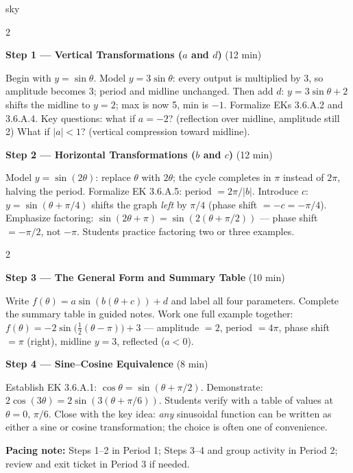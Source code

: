 \documentclass[10pt]{article}
\begin{document}
\begin{skillbox}{sky}
\begin{multicols}{2}

\textbf{Step 1 --- Vertical Transformations ($a$ and $d$)} (12 min)

Begin with $y=\sin\theta$. Model $y=3\sin\theta$: every output is
multiplied by 3, so amplitude becomes 3; period and midline unchanged.
Then add $d$: $y=3\sin\theta+2$ shifts the midline to $y=2$; max is
now 5, min is $-1$. Formalize EKs 3.6.A.2 and 3.6.A.4.
Key questions: what if $a=-2$? (reflection over midline, amplitude still 2)
What if $|a|<1$? (vertical compression toward midline).

\columnbreak

\textbf{Step 2 --- Horizontal Transformations ($b$ and $c$)} (12 min)

Model $y=\sin(2\theta)$: replace $\theta$ with $2\theta$; the cycle
completes in $\pi$ instead of $2\pi$, halving the period.
Formalize EK 3.6.A.5: period $=2\pi/|b|$.
Introduce $c$: $y=\sin(\theta+\pi/4)$ shifts the graph \emph{left}
by $\pi/4$ (phase shift $=-c=-\pi/4$). Emphasize factoring:
$\sin(2\theta+\pi)=\sin(2(\theta+\pi/2))$ --- phase shift $= -\pi/2$,
not $-\pi$. Students practice factoring two or three examples.

\end{multicols}

\begin{multicols}{2}

\textbf{Step 3 --- The General Form and Summary Table} (10 min)

Write $f(\theta)=a\sin(b(\theta+c))+d$ and label all four parameters.
Complete the summary table in guided notes. Work one full example together:
$f(\theta)=-2\sin\!\bigl(\tfrac{1}{2}(\theta-\pi)\bigr)+3$ ---
amplitude $=2$, period $=4\pi$, phase shift $=\pi$ (right),
midline $y=3$, reflected ($a<0$).

\columnbreak

\textbf{Step 4 --- Sine--Cosine Equivalence} (8 min)

Establish EK 3.6.A.1: $\cos\theta=\sin(\theta+\pi/2)$.
Demonstrate: $2\cos(3\theta)=2\sin(3(\theta+\pi/6))$.
Students verify with a table of values at $\theta=0,\,\pi/6$.
Close with the key idea: \emph{any} sinusoidal function can be written
as either a sine or cosine transformation; the choice is often one of
convenience.

\end{multicols}

\smallskip
\textbf{Pacing note:} Steps 1--2 in Period 1; Steps 3--4 and group
activity in Period 2; review and exit ticket in Period 3 if needed.
\end{skillbox}
\end{document}

